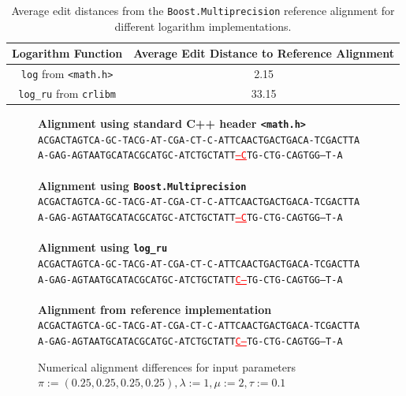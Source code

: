 \documentclass[runningheads,a4paper]{llncs}
\begin{document}
\begin{table}[h!]

\centering

\begin{tabular}{|c|c|}
\hline
Logarithm Function & Average Edit Distance to Reference Alignment\\
\hline
\texttt{log} from \texttt{<math.h>} & 2.15 \\
\hline
\texttt{log\_ru} from \texttt{crlibm} & 33.15 \\
\hline
\end{tabular}
\caption{Average edit distances from the \texttt{Boost.Multiprecision} reference alignment for different logarithm implementations.}
\label{fig:dist}
\end{table}


\begin{figure}

\textbf{Alignment using standard C++ header \texttt{<math.h>}}
~
\\
\texttt{ACGACTAGTCA-GC-TACG-AT-CGA-CT-C-ATTCAACTGACTGACA-TCGACTTA} \\
\texttt{A-GAG-AGTAATGCATACGCATGC-ATCTGCTATT\textcolor{red}{\underline{---C}}TG-CTG-CAGTGG--T-A}
\\~\\
\textbf{Alignment using \texttt{Boost.Multiprecision}}
~
\\
\texttt{ACGACTAGTCA-GC-TACG-AT-CGA-CT-C-ATTCAACTGACTGACA-TCGACTTA} \\
\texttt{A-GAG-AGTAATGCATACGCATGC-ATCTGCTATT\textcolor{red}{\underline{---C}}TG-CTG-CAGTGG--T-A}
\\~\\
\textbf{Alignment using \texttt{log\_ru}}
~
\\
\texttt{ACGACTAGTCA-GC-TACG-AT-CGA-CT-C-ATTCAACTGACTGACA-TCGACTTA} \\
\texttt{A-GAG-AGTAATGCATACGCATGC-ATCTGCTATT\textcolor{red}{\underline{C---}}TG-CTG-CAGTGG--T-A}
\\~\\
\textbf{Alignment from reference implementation}
~
\\
\texttt{ACGACTAGTCA-GC-TACG-AT-CGA-CT-C-ATTCAACTGACTGACA-TCGACTTA} \\
\texttt{A-GAG-AGTAATGCATACGCATGC-ATCTGCTATT\textcolor{red}{\underline{C---}}TG-CTG-CAGTGG--T-A}

\caption{Numerical alignment differences for input parameters $\pi:=(0.25,0.25,0.25,0.25), \lambda:=1, \mu:= 2, \tau := 0.1$}
\label{fig:alignments}
\end{figure}
\end{document}
